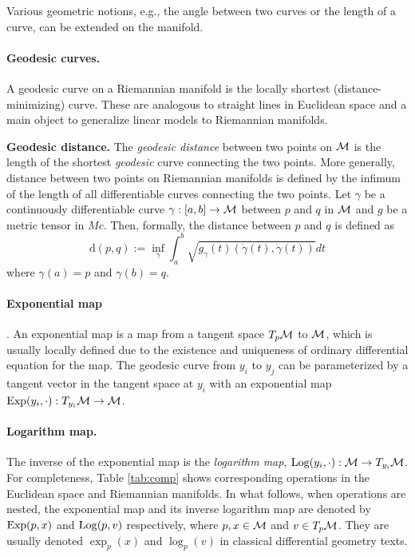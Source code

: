 Various geometric notions, e.g., the angle between two curves or the length of a curve, can be extended on the manifold. \newline 

\paragraph{Geodesic curves.} A geodesic curve on a Riemannian manifold is the locally shortest (distance-minimizing) curve.
These are analogous to straight lines in Euclidean space and a main object to generalize linear models to Riemannian manifolds.

\textbf{Geodesic distance.} The \textit{geodesic distance}
between two points on $\mathcal{M}$ is the length of the shortest {\em geodesic} curve connecting the two points. More generally, distance between two points on Riemannian manifolds is defined by the infimum of the length of all differentiable curves connecting the two points. Let $\gamma$ be a continuously differentiable curve $\gamma:[a,b] \rightarrow \mathcal{M}$ between $p$ and $q$ in $\mathcal{M}$ and $g$ be a metric tensor in $Mc$.
Then, formally, the distance between $p$ and $q$ is defined as
\begin{equation}
\text{d}(p,q) := \inf_\gamma \int_a^b \sqrt{g_\gamma(t) (\dot{\gamma}(t), \dot{\gamma}(t))} dt
\end{equation}
where $\gamma(a)=p$ and $\gamma(b)=q$.

\paragraph{Exponential map}. An exponential map is a map from a tangent space $T_p\mathcal{M}$  to $\mathcal{M}$, which is usually locally defined due to the existence and uniqueness of ordinary differential equation for the map. The geodesic curve from $y_i$ to $y_j$ can be parameterized by a tangent vector in the tangent space at $y_i$ with an exponential map $\operatorname*{Exp}(y_i,\cdot ): T_{y_i}\mathcal{M} \rightarrow \mathcal{M}$. 


\paragraph{Logarithm map.}
The inverse of the exponential map is the \textit{logarithm map}, $\operatorname*{Log}(y_i,\cdot):\mathcal{M} \rightarrow T_{y_i}\mathcal{M}$. 
For completeness, Table \ref{tab:comp} shows corresponding operations in the Euclidean space and Riemannian manifolds.
In what follows, when operations are nested, the exponential map and its inverse logarithm map are denoted by $\operatorname*{Exp}(p, x)$ and $\operatorname*{Log}(p, v)$ respectively, where $p, x \in \mathcal{M}$ and $v\in T_p\mathcal{M}$. They are usually denoted $\exp_p(x)$ and $\log_p(v)$ in classical differential geometry texts. 
 
